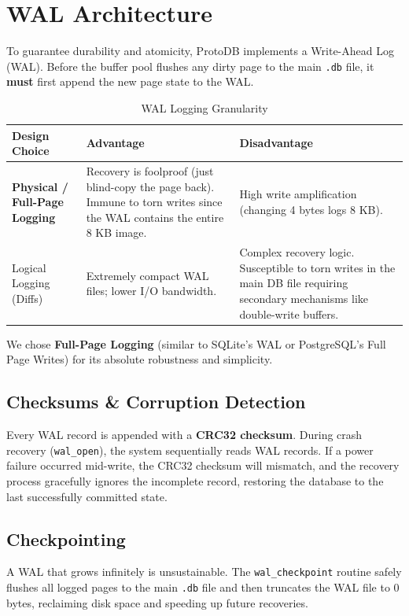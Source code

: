 \documentclass[12pt, a4paper]{report}
\begin{document}
\section{WAL Architecture}
To guarantee durability and atomicity, ProtoDB implements a Write-Ahead Log (WAL). Before the buffer pool flushes any dirty page to the main \texttt{.db} file, it \textbf{must} first append the new page state to the WAL.

\begin{table}[h]
\centering
\begin{tabularx}{\textwidth}{lXX}
\toprule
\textbf{Design Choice} & \textbf{Advantage} & \textbf{Disadvantage} \\
\midrule
\textbf{Physical / Full-Page Logging} &
    Recovery is foolproof (just blind-copy the page back). Immune to torn writes since the WAL contains the entire 8 KB image. &
    High write amplification (changing 4 bytes logs 8 KB). \\
\addlinespace
Logical Logging (Diffs) &
    Extremely compact WAL files; lower I/O bandwidth. &
    Complex recovery logic. Susceptible to torn writes in the main DB file requiring secondary mechanisms like double-write buffers. \\
\bottomrule
\end{tabularx}
\caption{WAL Logging Granularity}
\end{table}

We chose \textbf{Full-Page Logging} (similar to SQLite's WAL or PostgreSQL's Full Page Writes) for its absolute robustness and simplicity. 

\subsection{Checksums \& Corruption Detection}
Every WAL record is appended with a \textbf{CRC32 checksum}. During crash recovery (\texttt{wal\_open}), the system sequentially reads WAL records. If a power failure occurred mid-write, the CRC32 checksum will mismatch, and the recovery process gracefully ignores the incomplete record, restoring the database to the last successfully committed state.

\subsection{Checkpointing}
A WAL that grows infinitely is unsustainable. The \texttt{wal\_checkpoint} routine safely flushes all logged pages to the main \texttt{.db} file and then truncates the WAL file to 0 bytes, reclaiming disk space and speeding up future recoveries.
\end{document}
